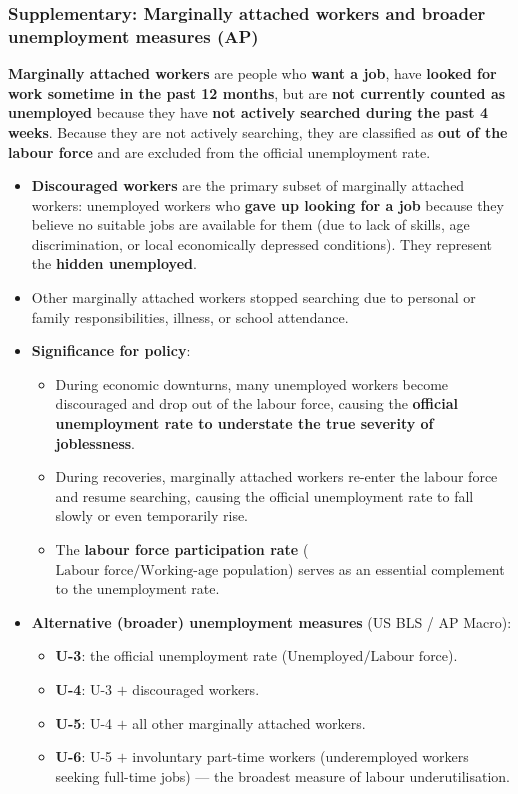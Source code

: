 \documentclass[a4paper,12pt]{article}
\newcommand{\needbold}[1]{\textcolor{red!70!black}{\textbf{#1}}}
\begin{document}
\subsubsection*{Supplementary: Marginally attached workers and broader unemployment measures (AP)}
\needbold{Marginally attached workers} are people who \textbf{want a job}, have \textbf{looked for work sometime in the past 12 months}, but are \textbf{not currently counted as unemployed} because they have \textbf{not actively searched during the past 4 weeks}. Because they are not actively searching, they are classified as \textbf{out of the labour force} and are excluded from the official unemployment rate.
\begin{itemize}
  \item \needbold{Discouraged workers} are the primary subset of marginally attached workers: unemployed workers who \textbf{gave up looking for a job} because they believe no suitable jobs are available for them (due to lack of skills, age discrimination, or local economically depressed conditions). They represent the \textbf{hidden unemployed}.
  \item Other marginally attached workers stopped searching due to personal or family responsibilities, illness, or school attendance.
  \item \textbf{Significance for policy}:
  \begin{itemize}
    \item During economic downturns, many unemployed workers become discouraged and drop out of the labour force, causing the \textbf{official unemployment rate to understate the true severity of joblessness}.
    \item During recoveries, marginally attached workers re-enter the labour force and resume searching, causing the official unemployment rate to fall slowly or even temporarily rise.
    \item The \textbf{labour force participation rate} ($\text{Labour force} / \text{Working-age population}$) serves as an essential complement to the unemployment rate.
  \end{itemize}
  \item \textbf{Alternative (broader) unemployment measures} (US BLS / AP Macro):
  \begin{itemize}
    \item \textbf{U-3}: the official unemployment rate ($\text{Unemployed} / \text{Labour force}$).
    \item \textbf{U-4}: U-3 $+$ discouraged workers.
    \item \textbf{U-5}: U-4 $+$ all other marginally attached workers.
    \item \textbf{U-6}: U-5 $+$ involuntary part-time workers (underemployed workers seeking full-time jobs) --- the broadest measure of labour underutilisation.
  \end{itemize}
\end{itemize}
\end{document}
